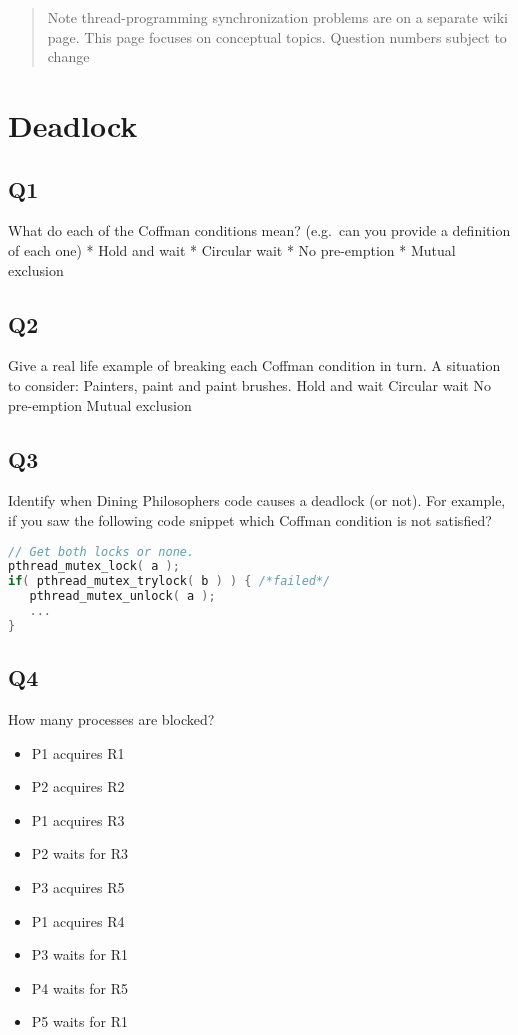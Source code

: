 \begin{quote}
Note thread-programming synchronization problems are on a separate wiki page. This page focuses on conceptual topics. Question numbers subject to change
\end{quote}

\section{Deadlock}

\subsection{Q1}\label{q1-1}

What do each of the Coffman conditions mean? (e.g.~can you provide a definition of each one) * Hold and wait * Circular wait * No pre-emption * Mutual exclusion

\subsection{Q2}\label{q2-1}

Give a real life example of breaking each Coffman condition in turn. A situation to consider: Painters, paint and paint brushes. Hold and wait Circular wait No pre-emption Mutual exclusion

\subsection{Q3}\label{q3-1}

Identify when Dining Philosophers code causes a deadlock (or not). For example, if you saw the following code snippet which Coffman condition is not satisfied?

\begin{lstlisting}[language=C]
// Get both locks or none.
pthread_mutex_lock( a );
if( pthread_mutex_trylock( b ) ) { /*failed*/
   pthread_mutex_unlock( a );
   ...
}
\end{lstlisting}

\subsection{Q4}\label{q4-1}

How many processes are blocked?

\begin{itemize}
\tightlist
\item
  P1 acquires R1
\item
  P2 acquires R2
\item
  P1 acquires R3
\item
  P2 waits for R3
\item
  P3 acquires R5
\item
  P1 acquires R4
\item
  P3 waits for R1
\item
  P4 waits for R5
\item
  P5 waits for R1
\end{itemize}

